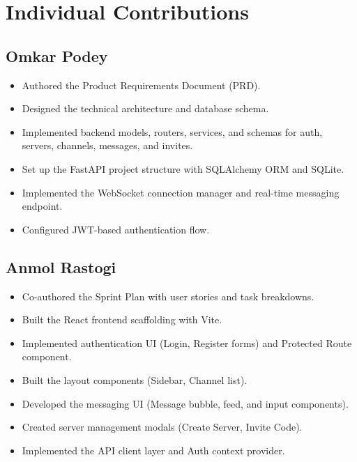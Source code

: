 \documentclass[11pt]{article}
\begin{document}
\section{Individual Contributions}

\subsection{Omkar Podey}
\begin{itemize}[leftmargin=1.5em]
    \item Authored the Product Requirements Document (PRD).
    \item Designed the technical architecture and database schema.
    \item Implemented backend models, routers, services, and schemas for auth, servers, channels, messages, and invites.
    \item Set up the FastAPI project structure with SQLAlchemy ORM and SQLite.
    \item Implemented the WebSocket connection manager and real-time messaging endpoint.
    \item Configured JWT-based authentication flow.
\end{itemize}

\subsection{Anmol Rastogi}
\begin{itemize}[leftmargin=1.5em]
    \item Co-authored the Sprint Plan with user stories and task breakdowns.
    \item Built the React frontend scaffolding with Vite.
    \item Implemented authentication UI (Login, Register forms) and Protected Route component.
    \item Built the layout components (Sidebar, Channel list).
    \item Developed the messaging UI (Message bubble, feed, and input components).
    \item Created server management modals (Create Server, Invite Code).
    \item Implemented the API client layer and Auth context provider.
\end{itemize}
\end{document}
